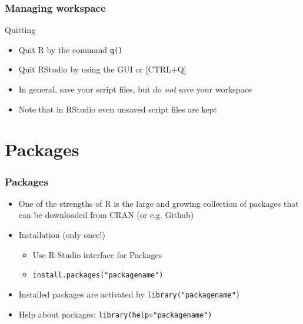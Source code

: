 \documentclass[xcolor={svgnames},10pt,
handout
]{beamer}
\begin{document}
\begin{frame}[fragile]
\frametitle{Managing workspace}
Quitting
\begin{itemize}
	\item Quit R by the command \lstinline|q()|
	\item Quit RStudio by using the GUI or [CTRL+Q]
	\item In general, save your script files, but do \emph{not} save your workspace
	\item Note that in RStudio even unsaved script files are kept
\end{itemize}
\end{frame}


\section{Packages}

\begin{frame}
\frametitle{Packages}
\begin{itemize}
	\item One of the strengths of R is the large and growing collection of packages that can be downloaded from CRAN (or e.g. Github)
	\item Installation (only once!)
	\begin{itemize}
	\item Use R-Studio interface for Packages
	\item \lstinline|install.packages("packagename")|
	\end{itemize}
	\item Installed packages are activated by \lstinline|library("packagename")|
	\item Help about packages: \lstinline|library(help="packagename")|
\end{itemize}
\end{frame}
\end{document}
